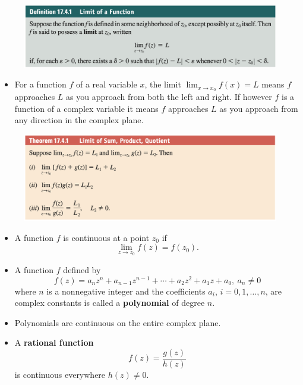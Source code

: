 \documentclass{article}
\begin{document}
\begin{figure}[H]
  \centering
  \includegraphics[width=\textwidth]{limit-of-a-function}
\end{figure}

\begin{itemize}
  \item For a function $f$ of a real variable $x$, the limit $\lim_{x \rightarrow x_0} f(x) = L$ means $f$ approaches $L$ as you approach from both the left and right. If however $f$ is a function of a complex variable it means $f$ approaches $L$ as you approach from any direction in the complex plane.
\end{itemize}

\begin{figure}[H]
  \centering
  \includegraphics[width=\textwidth]{limit-properties}
\end{figure}

\begin{itemize}
  \item A function $f$ is continuous at a point $z_0$ if \[\lim_{z \rightarrow z_0} f(z) = f(z_0).\]

  \item A function $f$ defined by \[f(z) = a_n z^n + a_{n - 1} z^{n - 1} + \cdots + a_2 z^2 + a_1 z + a_0,\ a_n \ne 0\] where $n$ is a nonnegative integer and the coefficients $a_i$, $i = 0, 1, \ldots, n$, are complex constants is called a \textbf{polynomial} of degree $n$.

  \item Polynomials are continuous on the entire complex plane.

  \item A \textbf{rational function} \[f(z) = \frac{g(z)}{h(z)}\] is continuous everywhere $h(z) \ne 0$.
\end{itemize}
\end{document}
